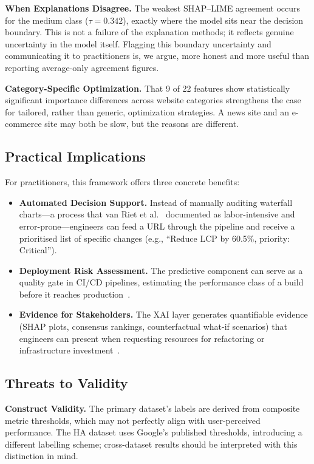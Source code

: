 \documentclass[sn-nature]{sn-jnl}
\begin{document}
\textbf{When Explanations Disagree.} The weakest SHAP--LIME agreement occurs for the medium class ($\tau = 0.342$), exactly where the model sits near the decision boundary. This is not a failure of the explanation methods; it reflects genuine uncertainty in the model itself. Flagging this boundary uncertainty and communicating it to practitioners is, we argue, more honest and more useful than reporting average-only agreement figures.

\textbf{Category-Specific Optimization.} That 9 of 22 features show statistically significant importance differences across website categories strengthens the case for tailored, rather than generic, optimization strategies. A news site and an e-commerce site may both be slow, but the reasons are different.

\subsection{Practical Implications}

For practitioners, this framework offers three concrete benefits:

\begin{itemize}
    \item \textbf{Automated Decision Support.} Instead of manually auditing waterfall charts---a process that van Riet et al.~\cite{vanriet2023} documented as labor-intensive and error-prone---engineers can feed a URL through the pipeline and receive a prioritised list of specific changes (e.g., ``Reduce LCP by 60.5\%, priority: Critical'').

    \item \textbf{Deployment Risk Assessment.} The predictive component can serve as a quality gate in CI/CD pipelines, estimating the performance class of a build before it reaches production~\cite{dakic2025}.

    \item \textbf{Evidence for Stakeholders.} The XAI layer generates quantifiable evidence (SHAP plots, consensus rankings, counterfactual what-if scenarios) that engineers can present when requesting resources for refactoring or infrastructure investment~\cite{hassija2024}.
\end{itemize}

\subsection{Threats to Validity}

\textbf{Construct Validity.} The primary dataset's labels are derived from composite metric thresholds, which may not perfectly align with user-perceived performance. The HA dataset uses Google's published thresholds, introducing a different labelling scheme; cross-dataset results should be interpreted with this distinction in mind.
\end{document}
